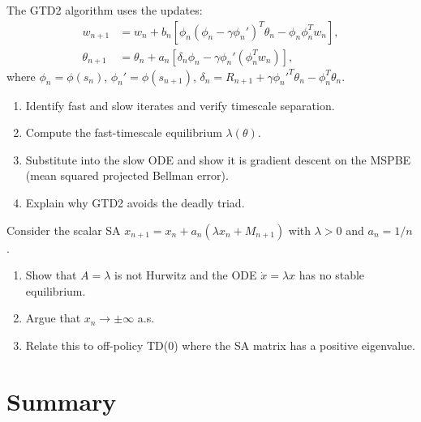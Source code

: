 \documentclass[11pt,a4paper]{article}
\begin{document}
\begin{exercise}
\label{ex:gtd2}
The GTD2 algorithm uses the updates:
\begin{align*}
  w_{n+1} &= w_n + b_n[\phi_n(\phi_n - \gamma\phi_n')^T\theta_n
    - \phi_n\phi_n^Tw_n], \\
  \theta_{n+1} &= \theta_n
    + a_n[\delta_n\phi_n - \gamma\phi_n'(\phi_n^Tw_n)],
\end{align*}
where $\phi_n = \phi(s_n)$, $\phi_n' = \phi(s_{n+1})$,
$\delta_n = R_{n+1} + \gamma\phi_n'^T\theta_n - \phi_n^T\theta_n$.
\begin{enumerate}[label=(\alph*)]
  \item Identify fast and slow iterates and verify timescale
    separation.
  \item Compute the fast-timescale equilibrium $\lambda(\theta)$.
  \item Substitute into the slow ODE and show it is gradient descent
    on the MSPBE (mean squared projected Bellman error).
  \item Explain why GTD2 avoids the deadly triad.
\end{enumerate}
\end{exercise}

\begin{exercise}
\label{ex:non-hurwitz}
Consider the scalar SA $x_{n+1} = x_n + a_n(\lambda x_n + M_{n+1})$
with $\lambda > 0$ and $a_n = 1/n$.
\begin{enumerate}[label=(\alph*)]
  \item Show that $A = \lambda$ is not Hurwitz and the ODE
    $\dot{x} = \lambda x$ has no stable equilibrium.
  \item Argue that $x_n \to \pm\infty$ a.s.
  \item Relate this to off-policy TD(0) where the SA matrix has a
    positive eigenvalue.
\end{enumerate}
\end{exercise}


\section{Summary}
\label{sec:summary}
\end{document}
